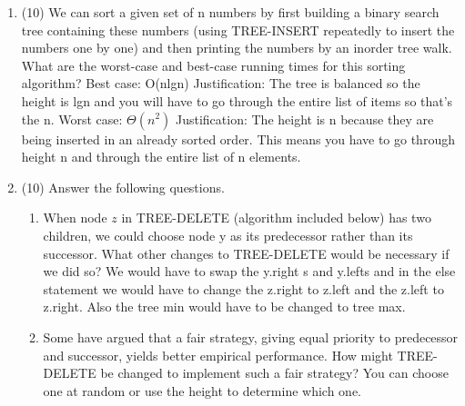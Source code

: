\documentclass[12pt]{article}
\newenvironment{problem}[2][Problem]{\begin{trivlist}
\item[\hskip \labelsep {\bfseries #1}\hskip \labelsep {\bfseries #2.}]}{\end{trivlist}}
\begin{document}
\begin{enumerate}
\item (10) We can sort a given set of n numbers by first building a binary search tree containing these numbers (using TREE-INSERT repeatedly to insert the numbers one by
one) and then printing the numbers by an inorder tree walk. What are the worst-case
and best-case running times for this sorting algorithm?
\newline Best case: O(nlgn)
\newline Justification: The tree is balanced so the height is lgn and you will have to go through the entire list of items so that's the n.
\newline Worst case: $\Theta (n^2)$
\newline Justification: The height is n because they are being inserted in an already sorted order. This means you have to go through height n and through the entire list of n elements.

\item (10) Answer the following questions.
\begin{enumerate}
\item When node $z$ in TREE-DELETE (algorithm included below) has two children, we could choose 
node y as its predecessor rather than its successor. What other changes to TREE-DELETE
would be necessary if we did so? We would have to swap the y.right s and y.lefts and in the else statement we would have to change the z.right to z.left and the z.left to z.right. Also the tree min would have to be changed to tree max.

\item Some have argued that a fair strategy, giving
equal priority to predecessor and successor, yields better empirical performance.
How might TREE-DELETE be changed to implement such a fair strategy? You can choose one at random or use the height to determine which one.
\end{enumerate}

\end{enumerate}

\end{document}

